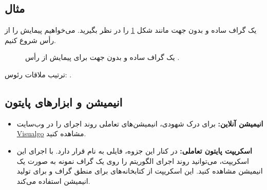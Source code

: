 \subsection{مثال}
یک گراف ساده و بدون جهت مانند شکل \ref{fig:bfs_example_graph} را در نظر بگیرید. می‌خواهیم پیمایش  را از رأس  شروع کنیم.
\begin{figure}[H]
	\centering
	\caption{یک گراف ساده و بدون جهت برای پیمایش  از رأس .}
	\label{fig:bfs_example_graph}
\end{figure}
ترتیب ملاقات رئوس: \textbf{}.

\subsection{انیمیشن و ابزارهای پایتون}
\begin{itemize}
	\item \textbf{انیمیشن آنلاین:} برای درک شهودی، انیمیشن‌های تعاملی روند اجرای  را در وب‌سایت \href{https://visualgo.net/en/dfsbfs}{Visualgo} مشاهده کنید.
	\item \textbf{اسکریپت پایتون تعاملی:} در کنار این جزوه، فایلی به نام  قرار دارد. با اجرای این اسکریپت، می‌توانید روند اجرای الگوریتم  را روی یک گراف نمونه به صورت یک انیمیشن مشاهده کنید. این اسکریپت از کتابخانه‌های  برای منطق گراف و  برای تولید انیمیشن استفاده می‌کند.
\end{itemize}